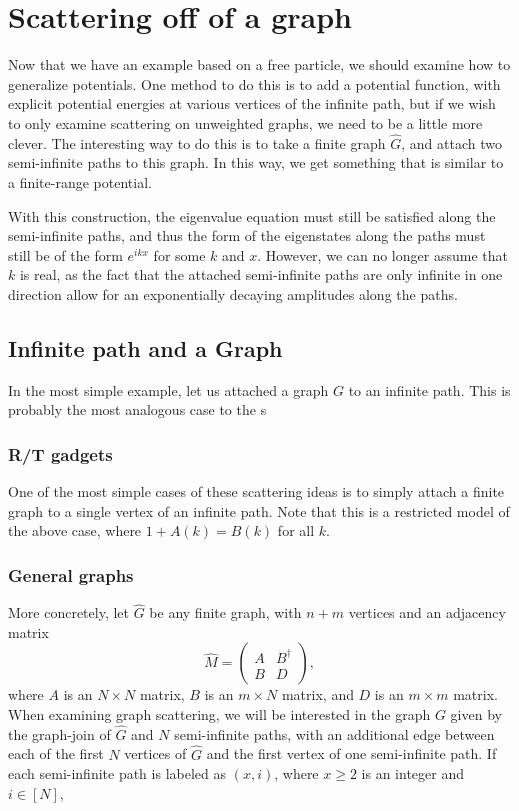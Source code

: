 \documentclass[../thesis-main/thesis-main]{subfiles}
\begin{document}
\section{Scattering off of a graph}

Now that we have an example based on a free particle, we should examine how to generalize potentials.  One method to do this is to add a potential function, with explicit potential energies at various vertices of the infinite path, but if we wish to only examine scattering on unweighted graphs, we need to be a little more clever.  The interesting way to do this is to take a finite graph $\hat{G}$, and attach two semi-infinite paths to this graph.  In this way, we get something that is similar to a finite-range potential.

With this construction, the eigenvalue equation must still be satisfied along the semi-infinite paths, and thus the form of the eigenstates along the paths must still be of the form $e^{i k x}$ for some $k$ and $x$.  However, we can no longer assume that $k$ is real, as the fact that the attached semi-infinite paths are only infinite in one direction allow for an exponentially decaying amplitudes along the paths.


\subsection{Infinite path and a Graph}

In the most simple example, let us attached a graph $G$ to an infinite path.  This is probably the most analogous case to the s

\subsubsection{R/T gadgets}

One of the most simple cases of these scattering ideas is to simply attach a finite graph to a single vertex of an infinite path.  Note that this is a restricted model of the above case, where $1 + A(k) = B(k)$ for all $k$.  


\subsubsection{General graphs}


More concretely, let $\widehat{G}$ be any finite graph, with $n+m$ vertices and an adjacency matrix
\begin{equation}
  \widehat{M} = \begin{pmatrix}A & B^\dag\\ B & D\end{pmatrix},
\end{equation}
where $A$ is an $N\times N$ matrix, $B$ is an $m\times N$ matrix, and $D$ is an $m\times m$ matrix.  When examining graph scattering, we will be interested in the graph $G$ given by the graph-join of $\widehat{G}$ and $N$ semi-infinite paths, with an additional edge between each of the first $N$ vertices of $\widehat{G}$ and the first vertex of one semi-infinite path.  If each semi-infinite path is labeled as $(x,i)$, where $x\geq 2$ is an integer and $i\in[N]$, 
\end{document}
